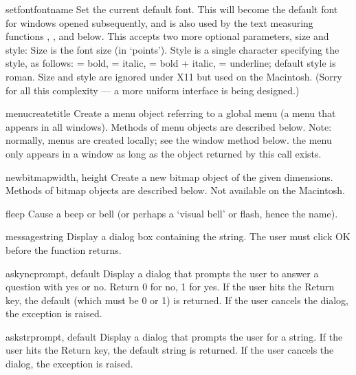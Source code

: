 \begin{funcdesc}{setfont}{fontname}
Set the current default font.
This will become the default font for windows opened subsequently,
and is also used by the text measuring functions ,
,  and  below.
This accepts two more optional parameters, size and style:
Size is the font size (in `points').
Style is a single character specifying the style, as follows:
 = bold,
 = italic,
 = bold + italic,
 = underline;
default style is roman.
Size and style are ignored under X11 but used on the Macintosh.
(Sorry for all this complexity --- a more uniform interface is being designed.)
\end{funcdesc}

\begin{funcdesc}{menucreate}{title}
Create a menu object referring to a global menu (a menu that appears in
all windows).
Methods of menu objects are described below.
Note: normally, menus are created locally; see the window method
 below.
 the menu only appears in a window as long as the object
returned by this call exists.
\end{funcdesc}

\begin{funcdesc}{newbitmap}{width, height}
Create a new bitmap object of the given dimensions.
Methods of bitmap objects are described below.
Not available on the Macintosh.
\end{funcdesc}

\begin{funcdesc}{fleep}{}
Cause a beep or bell (or perhaps a `visual bell' or flash, hence the
name).
\end{funcdesc}

\begin{funcdesc}{message}{string}
Display a dialog box containing the string.
The user must click OK before the function returns.
\end{funcdesc}

\begin{funcdesc}{askync}{prompt, default}
Display a dialog that prompts the user to answer a question with yes or
no.
Return 0 for no, 1 for yes.
If the user hits the Return key, the default (which must be 0 or 1) is
returned.
If the user cancels the dialog, the
exception is raised.
\end{funcdesc}

\begin{funcdesc}{askstr}{prompt, default}
Display a dialog that prompts the user for a string.
If the user hits the Return key, the default string is returned.
If the user cancels the dialog, the
exception is raised.
\end{funcdesc}

